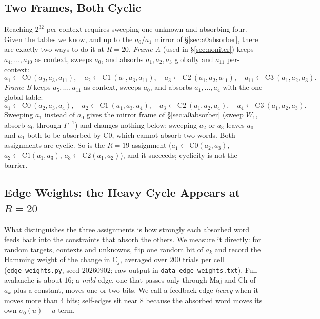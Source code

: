 \documentclass[11pt,a4paper]{article}
\newcommand{\sig}[1]{\sigma_{#1}}
\newcommand{\Maj}{\mathrm{Maj}}
\newcommand{\Ch}{\mathrm{Ch}}
\begin{document}
\subsection{Two Frames, Both Cyclic}
\label{sec:frames}

Reaching $2^{32}$ per context requires sweeping one unknown and absorbing
four.  Given the tables we know, and up to the $a_0/a_1$ mirror of
\S\ref{sec:a0absorber}, there are exactly two ways to do it at $R{=}20$.
\emph{Frame A} (used in \S\ref{sec:noniter}) keeps $a_4,\ldots,a_{10}$ as
context, sweeps $a_0$, and absorbs $a_1,a_2,a_3$ globally and $a_{11}$
per-context:
\[
  a_1 \leftarrow \mathrm{C0}\ (a_2,a_3,a_{11}), \quad
  a_2 \leftarrow \mathrm{C1}\ (a_1,a_3,a_{11}), \quad
  a_3 \leftarrow \mathrm{C2}\ (a_1,a_2,a_{11}), \quad
  a_{11} \leftarrow \mathrm{C3}\ (a_1,a_2,a_3).
\]
\emph{Frame B} keeps $a_5,\ldots,a_{11}$ as context, sweeps $a_0$, and absorbs
$a_1,\ldots,a_4$ with the one global table:
\[
  a_1 \leftarrow \mathrm{C0}\ (a_2,a_3,a_4), \quad
  a_2 \leftarrow \mathrm{C1}\ (a_1,a_3,a_4), \quad
  a_3 \leftarrow \mathrm{C2}\ (a_1,a_2,a_4), \quad
  a_4 \leftarrow \mathrm{C3}\ (a_1,a_2,a_3).
\]
Sweeping $a_1$ instead of $a_0$ gives the mirror frame of
\S\ref{sec:a0absorber} (sweep $W_1$, absorb $a_0$ through $\Gamma^{-1}$)
and changes nothing below; sweeping $a_2$ or $a_3$ leaves $a_0$ and $a_1$
both to be absorbed by C0, which cannot absorb two words.  Both
assignments are cyclic.  So is the $R{=}19$ assignment
($a_1\leftarrow\mathrm{C0}(a_2,a_3)$, $a_2\leftarrow\mathrm{C1}(a_1,a_3)$,
$a_3\leftarrow\mathrm{C2}(a_1,a_2)$), and it succeeds; cyclicity is not the
barrier.

\subsection{Edge Weights: the Heavy Cycle Appears at \texorpdfstring{$R=20$}{R=20}}
\label{sec:heavy}

What distinguishes the three assignments is how strongly each absorbed word
feeds back into the constraints that absorb the others.  We measure it
directly: for random targets, contexts and unknowns, flip one random bit of
$a_k$ and record the Hamming weight of the change in $\mathrm{C}_j$, averaged
over $200$ trials per cell (\texttt{edge\_weights.py}, seed $20260902$; raw
output in \texttt{data\_edge\_weights.txt}).  Full avalanche is about $16$;
a \emph{mild} edge, one that passes only through $\Maj$ and $\Ch$ of $a_k$
plus a constant, moves one or two bits.  We call a feedback edge
\emph{heavy} when it moves more than $4$ bits; self-edges sit near $8$
because the absorbed word moves its own $\sig{0}(u)-u$ term.
\end{document}
